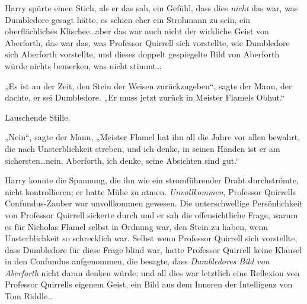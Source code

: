 Harry spürte einen Stich, als er das sah, ein Gefühl, dass dies \emph{nicht} das war, was Dumbledore gesagt hätte, es schien eher ein Strohmann zu sein, ein oberflächliches Klischee…aber das war auch nicht der wirkliche Geist von Aberforth, das war das, was Professor Quirrell sich vorstellte, wie Dumbledore sich Aberforth vorstellte, und dieses doppelt gespiegelte Bild von Aberforth würde nichts bemerken, was nicht stimmt…

„Es ist an der Zeit, den Stein der Weisen zurückzugeben“, sagte der Mann, der dachte, er sei Dumbledore. „Er muss jetzt zurück in Meister Flamels Obhut.“

Lauschende Stille.

„Nein“, sagte der Mann, „Meister Flamel hat ihn all die Jahre vor allen bewahrt, die nach Unsterblichkeit streben, und ich denke, in seinen Händen ist er am sichersten…nein, Aberforth, ich denke, seine Absichten sind gut.“

Harry konnte die Spannung, die ihn wie ein stromführender Draht durchströmte, nicht kontrollieren; er hatte Mühe zu atmen. \emph{Unvollkommen}, Professor Quirrells Confundus-Zauber war unvollkommen gewesen. Die unterschwellige Persönlichkeit von Professor Quirrell sickerte durch und er sah die offensichtliche Frage, warum es für Nicholas Flamel selbst in Ordnung war, den Stein zu haben, wenn Unsterblichkeit so schrecklich war. Selbst wenn Professor Quirrell sich vorstellte, dass Dumbledore für diese Frage blind war, hatte Professor Quirrell keine Klausel in den Confundus aufgenommen, die besagte, dass \emph{Dumbledores Bild von Aberforth} nicht daran denken würde; und all dies war letztlich eine Reflexion von Professor Quirrells eigenem Geist, ein Bild aus dem Inneren der Intelligenz von Tom Riddle…

